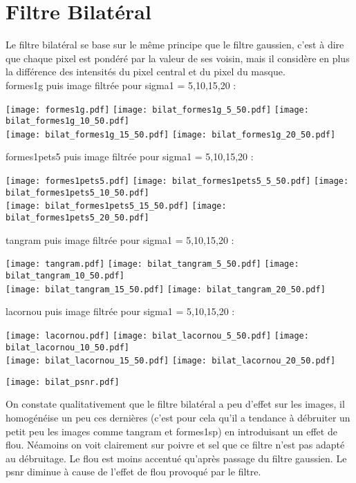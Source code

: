 \documentclass[12pt]{article}
\numberwithin{equation}{section}
\begin{document}
\section{Filtre Bilatéral}
Le filtre bilatéral se base sur le même principe que le filtre gaussien, c'est à dire que chaque pixel est pondéré par la valeur de ses voisin, mais il considère en plus la différence des intensités du pixel central et du pixel du masque.\\ 
formes1g puis image filtrée pour sigma1 = 5,10,15,20 :\\
\begin{center}
\texttt{[image: formes1g.pdf]}
\texttt{[image: bilat\_formes1g\_5\_50.pdf]}
\texttt{[image: bilat\_formes1g\_10\_50.pdf]}\\
\texttt{[image: bilat\_formes1g\_15\_50.pdf]}
\texttt{[image: bilat\_formes1g\_20\_50.pdf]}
\end{center}
formes1pets5 puis image filtrée pour sigma1 = 5,10,15,20 :\\
\begin{center}
\texttt{[image: formes1pets5.pdf]}
\texttt{[image: bilat\_formes1pets5\_5\_50.pdf]}
\texttt{[image: bilat\_formes1pets5\_10\_50.pdf]}\\
\texttt{[image: bilat\_formes1pets5\_15\_50.pdf]}
\texttt{[image: bilat\_formes1pets5\_20\_50.pdf]}
\end{center}
tangram puis image filtrée pour sigma1 = 5,10,15,20 :\\
\begin{center}
\texttt{[image: tangram.pdf]}
\texttt{[image: bilat\_tangram\_5\_50.pdf]}
\texttt{[image: bilat\_tangram\_10\_50.pdf]}\\
\texttt{[image: bilat\_tangram\_15\_50.pdf]}
\texttt{[image: bilat\_tangram\_20\_50.pdf]}
\end{center}
lacornou puis image filtrée pour sigma1 = 5,10,15,20 :\\
\begin{center}
\texttt{[image: lacornou.pdf]}
\texttt{[image: bilat\_lacornou\_5\_50.pdf]}
\texttt{[image: bilat\_lacornou\_10\_50.pdf]}\\
\texttt{[image: bilat\_lacornou\_15\_50.pdf]}
\texttt{[image: bilat\_lacornou\_20\_50.pdf]}
\end{center}

\begin{center}
\texttt{[image: bilat\_psnr.pdf]}\\
\end{center}

On constate qualitativement que le filtre bilatéral a peu d'effet sur les images, il homogénéise un peu ces dernières (c'est pour cela qu'il a tendance à débruiter un petit peu les images comme tangram et formes1sp) en introduisant un effet de flou. Néamoins on voit clairement sur poivre et sel que ce filtre n'est pas adapté au débruitage. Le flou est moins accentué qu'après passage du filtre gaussien. Le psnr diminue à cause de l'effet de flou provoqué par le filtre.
\end{document}
